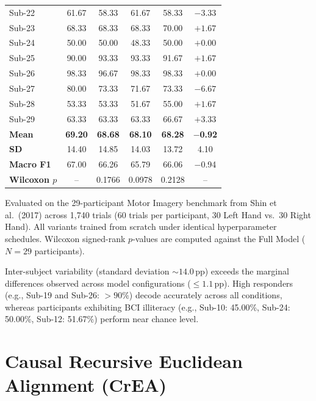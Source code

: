 \documentclass[journal]{IEEEtran}
\begin{document}
\begin{table}[!htbp]
{\begin{tabular}{@{}lccccc@{}}
Sub-22 & 61.67 & 58.33 & 61.67 & 58.33 & $-3.33$ \\
Sub-23 & 68.33 & 68.33 & 68.33 & 70.00 & $+1.67$ \\
Sub-24 & 50.00 & 50.00 & 48.33 & 50.00 & $+0.00$ \\
Sub-25 & 90.00 & 93.33 & 93.33 & 91.67 & $+1.67$ \\
Sub-26 & 98.33 & 96.67 & 98.33 & 98.33 & $+0.00$ \\
Sub-27 & 80.00 & 73.33 & 71.67 & 73.33 & $-6.67$ \\
Sub-28 & 53.33 & 53.33 & 51.67 & 55.00 & $+1.67$ \\
Sub-29 & 63.33 & 63.33 & 63.33 & 66.67 & $+3.33$ \\
\midrule
\textbf{Mean} & \textbf{69.20} & \textbf{68.68} & \textbf{68.10} & \textbf{68.28} & \textbf{$-$0.92} \\
\textbf{SD} & 14.40 & 14.85 & 14.03 & 13.72 & 4.10 \\
\textbf{Macro F1} & 67.00 & 66.26 & 65.79 & 66.06 & $-$0.94 \\
\textbf{Wilcoxon $p$} & -- & 0.1766 & 0.0978 & 0.2128 & -- \\
\bottomrule
\end{tabular}%
}
\par\smallskip
{\scriptsize Evaluated on the 29-participant Motor Imagery benchmark from Shin et al.\ (2017) \cite{shin2017open} across 1,740 trials (60 trials per participant, 30 Left Hand vs.\ 30 Right Hand). All variants trained from scratch under identical hyperparameter schedules. Wilcoxon signed-rank $p$-values are computed against the Full Model ($N=29$ participants).}
\end{table}

Inter-subject variability (standard deviation $\sim 14.0$\,pp) exceeds the marginal differences observed across model configurations ($\le 1.1$\,pp). High responders (e.g., Sub-19 and Sub-26: $>90\%$) decode accurately across all conditions, whereas participants exhibiting BCI illiteracy (e.g., Sub-10: 45.00\%, Sub-24: 50.00\%, Sub-12: 51.67\%) perform near chance level.

\section{Causal Recursive Euclidean Alignment (CrEA)}
\label{sec:supp_crea}
\end{document}
